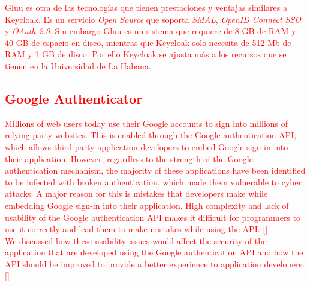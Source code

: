 	
	\textcolor{red}{Gluu es otra de las tecnologías que tienen prestaciones y ventajas similares a Keycloak. Es un servicio \textit{Open Source} que soporta \textit{SMAL}, \textit{OpenID Connect SSO} y \textit{OAuth 2.0}. Sin embargo Gluu es un sistema que requiere de 8 GB de RAM y 40 GB de espacio en disco, mientras que Keycloak solo necesita de 512 Mb de RAM y 1 GB de disco. Por ello Keycloak se ajusta más a los recursos que se tienen en la Universidad de La Habana.}
	
	\textcolor{red}{
	\subsection{Google Authenticator}
	Millions of web users today use their Google accounts to sign into millions of relying party websites. This is enabled through the Google authentication API, which allows third party application developers to embed Google sign-in into their application. However, regardless to the strength of the Google authentication mechanism, the majority of these applications have been identified to be infected with broken authentication, which made them vulnerable to cyber attacks. A major reason for this is mistakes that developers make while embedding Google sign-in into their application. High complexity and lack of usability of the Google authentication API makes it difficult for programmers to use it correctly and lead them to make mistakes while using the API. [\cite{wijayarathna2019empirical}]
	\\
	We discussed how these usability issues would affect the security of the application that are developed using the Google authentication API and how the API should be improved to provide a better experience to application developers. [\cite{wijayarathna2019empirical}]}